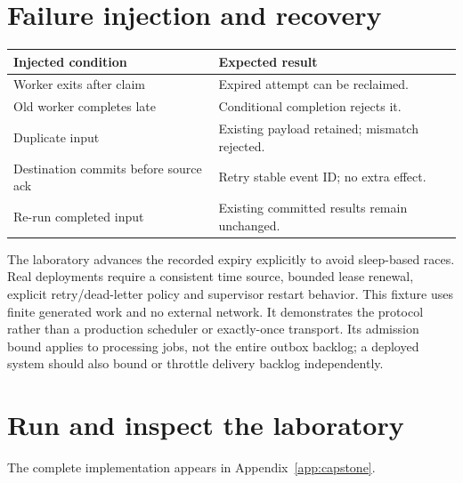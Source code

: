 \section{Failure injection and recovery}
\begin{longtable}{L{.33\linewidth}L{.59\linewidth}}
\toprule Injected condition & Expected result \\ \midrule\endhead
Worker exits after claim & Expired attempt can be reclaimed.\\
Old worker completes late & Conditional completion rejects it.\\
Duplicate input & Existing payload retained; mismatch rejected.\\
Destination commits before source ack & Retry stable event ID; no extra effect.\\
Re-run completed input & Existing committed results remain unchanged.\\
\bottomrule
\end{longtable}
The laboratory advances the recorded expiry explicitly to avoid
sleep-based races. Real deployments require a consistent time source,
bounded lease renewal, explicit retry/dead-letter policy and supervisor
restart behavior. This fixture uses finite generated work and no external
network. It demonstrates the protocol rather than a production scheduler
or exactly-once transport. Its admission bound applies to processing
jobs, not the entire outbox backlog; a deployed system should also bound
or throttle delivery backlog independently.

\section{Run and inspect the laboratory}
The complete implementation appears in Appendix~\ref{app:capstone}.
